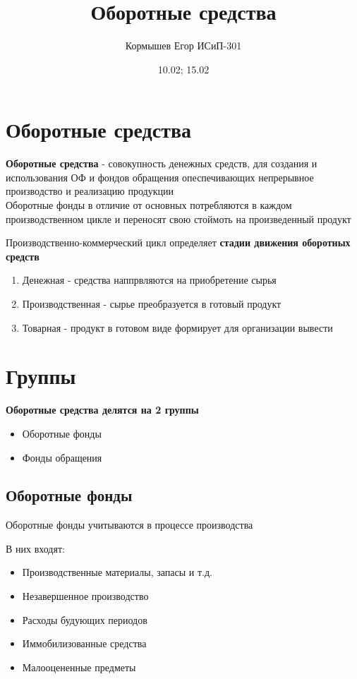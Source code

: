 \documentclass[11pt]{article}
\author{Кормышев Егор ИСиП-301}
\date{10.02; 15.02}
\title{Оборотные средства}
\begin{document}
\maketitle
\tableofcontents


\section{Оборотные средства}
\label{sec:org15dcb0d}

\textbf{Оборотные средства} - совокупность денежных средств, для создания и использования ОФ и фондов обращения опеспечивающих непрерывное производство и реализацию продукции \\[0pt]

Оборотные фонды в отличие от основных потребляются в каждом производственном цикле и переносят свою стоймоть на произведенный продукт

Производственно-коммерческий цикл определяет \textbf{стадии движения оборотных средств}

\begin{enumerate}
\item Денежная - средства наппрвляются на приобретение сырья
\item Производственная -  сырье преобразуется в готовый продукт
\item Товарная - продукт в готовом виде формирует для организации вывести
\end{enumerate}

\section{Группы}
\label{sec:org3b69d75}

\begin{center}
\textbf{Оборотные средства делятся на 2 группы}
\end{center}
\begin{itemize}
\item Оборотные фонды
\item Фонды обращения
\end{itemize}
\subsection{Оборотные фонды}
\label{sec:org5a9e664}
Оборотные фонды учитываются в процессе производства
\begin{center}
В них входят:
\end{center}

\begin{itemize}
\item Производственные материалы, запасы и т.д.

\item Незавершенное производство

\item Расходы будующих периодов

\item Иммобилизованные средства

\item Малооцененные предметы
\end{itemize}
\end{document}
